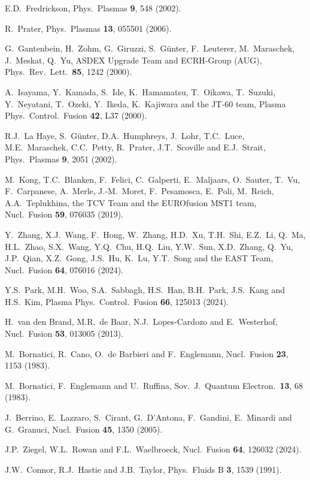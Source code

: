 \documentclass[12pt,prb,aps]{revtex4-1}
\begin{document}
\begin{thebibliography}{99}
 E.D.~Fredrickson, Phys.\ Plasmas {\bf 9}, 548 (2002).

 R.~Prater, Phys.\ Plasmas {\bf 13}, 055501 (2006).

 G.~Gantenbein, H.~Zohm, G.~Giruzzi, S.~G\"{u}nter, F.~Leuterer, M.~Maraschek, J.~Meskat, Q.~Yu,  ASDEX Upgrade Team and ECRH-Group (AUG), 
Phys.\ Rev.\ Lett.\ {\bf 85}, 1242 (2000). 

 A.~Isayama, Y.~Kamada, S.~Ide, K.~Hamamatsu, T.~Oikawa, T.~Suzuki, Y.~Neyatani, T.~Ozeki, Y.~Ikeda, K.~Kajiwara and the JT-60 team,  
Plasma Phys.\  Control.\ Fusion {\bf 42}, L37 (2000).

 R.J.~La Haye,  S.~G\"{u}nter,  D.A.~Humphreys,  J.~Lohr,  T.C.~Luce,  M.E.~Maraschek,  C.C.~Petty, R.~Prater,  J.T.~Scoville and E.J.~Strait,
 Phys.\ Plasmas {\bf 9}, 2051 (2002).
 
  M.~Kong, T.C.~Blanken, F.~Felici, C.~Galperti, E.~Maljaars,
O.~Sauter, T.~Vu, F.~Carpanese, A.~Merle, J.-M.~Moret, F.~Pesamosca, E.~Poli, M.~Reich, A.A.~Teplukhina, the TCV Team and the EUROfusion MST1 team,
Nucl.\ Fusion {\bf 59}, 076035 (2019).

 Y.~Zhang, X.J.~Wang, F.~Hong, W.~Zhang, H.D.~Xu, T.H.~Shi, E.Z.~Li, Q.~Ma, H.L.~Zhao, S.X.~Wang, Y.Q.~Chu, H.Q.~Liu, Y.W.~Sun, 
X.D.~Zhang, Q.~Yu, J.P.~Qian, X.Z.~Gong, J.S.~Hu, K.~Lu, Y.T.~Song and the EAST Team, 
 Nucl.\ Fusion {\bf 64},  076016 (2024).

 Y.S.~Park, M.H.~Woo, S.A.~Sabbagh, H.S.~Han, B.H.~Park, J.S.~Kang and H.S.~Kim,  Plasma Phys.\ Control.\ Fusion {\bf 66}, 125013 (2024).

 H.~van den Brand, M.R.~de Baar, N.J.~Lopes-Cardozo and E.~Westerhof, Nucl.\ Fusion {\bf 53}, 013005 (2013). 
  
 M.~Bornatici, R.~Cano, O.~de Barbieri and F.~Englemann, Nucl.\ Fusion {\bf 23}, 1153 (1983). 

 M.~Bornatici, F.~Englemann and U.~Ruffina, Sov.\ J.\ Quantum Electron.\ {\bf 13}, 68 (1983).

 J.~Berrino, E.~Lazzaro, S.~Cirant, G.~D'Antona, F.~Gandini, E.~Minardi and G.~Granuci, Nucl.\ Fusion {\bf 45}, 1350 (2005).

 J.P.~Ziegel, W.L.~Rowan and F.L.~Waelbroeck, Nucl.\ Fusion {\bf 64}, 126032 (2024).

 J.W.~Connor, R.J.~Hastie and J.B.~Taylor, Phys.\ Fluids B {\bf 3}, 1539 (1991).


\end{thebibliography}
\end{document}
